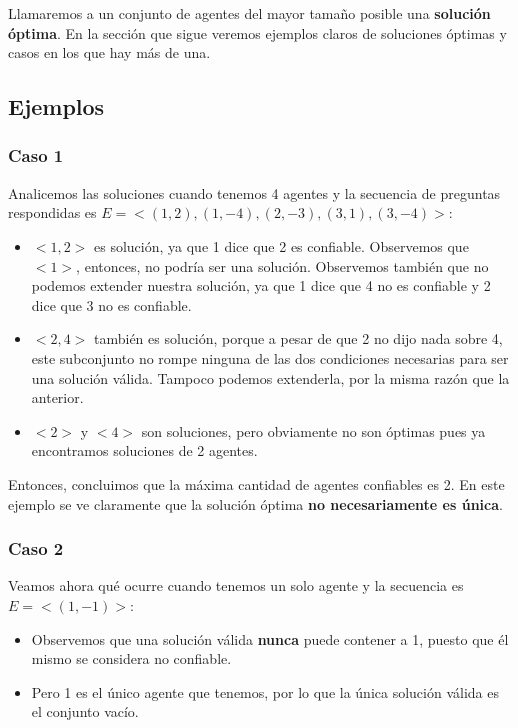 \documentclass[10pt, a4paper]{article}
\begin{document}
		Llamaremos a un conjunto de agentes del mayor tama\~no posible una \textbf{soluci\'on \'optima}. En la secci\'on que sigue veremos ejemplos claros de soluciones \'optimas y casos en los que hay m\'as de una.
	
	\subsection{Ejemplos}
	
	\subsubsection{Caso 1}
	
		Analicemos las soluciones cuando tenemos 4 agentes y la secuencia de preguntas respondidas es $E = <(1,2), (1,-4), (2,-3), (3,1), (3,-4)>$:
		
		\begin{itemize}
		\item $<1, 2>$ es soluci\'on, ya que 1 dice que 2 es confiable. Observemos que $<1>$, entonces, no podr\'ia ser una soluci\'on. Observemos tambi\'en que no podemos extender nuestra soluci\'on, ya que 1 dice que 4 no es confiable y 2 dice que 3 no es confiable.
		\item $<2,4>$ tambi\'en es soluci\'on, porque a pesar de que 2 no dijo nada sobre 4, este subconjunto no rompe ninguna de las dos condiciones necesarias para ser una soluci\'on v\'alida. Tampoco podemos extenderla, por la misma raz\'on que la anterior.
		\item $<2>$ y $<4>$ son soluciones, pero obviamente no son \'optimas pues ya encontramos soluciones de 2 agentes.
		\end{itemize}
		
		Entonces, concluimos que la m\'axima cantidad de agentes confiables es 2. En este ejemplo se ve claramente que la soluci\'on \'optima \textbf{no necesariamente es \'unica}.
		
	\subsubsection{Caso 2}
	
		Veamos ahora qu\'e ocurre cuando tenemos un solo agente y la secuencia es $E = <(1,-1)>$:
		
		\begin{itemize}
		\item Observemos que una soluci\'on v\'alida \textbf{nunca} puede contener a 1, puesto que \'el mismo se considera no confiable.
		\item Pero 1 es el \'unico agente que tenemos, por lo que la \'unica soluci\'on v\'alida es el conjunto vac\'io.
		\end{itemize}
		
\end{document}
